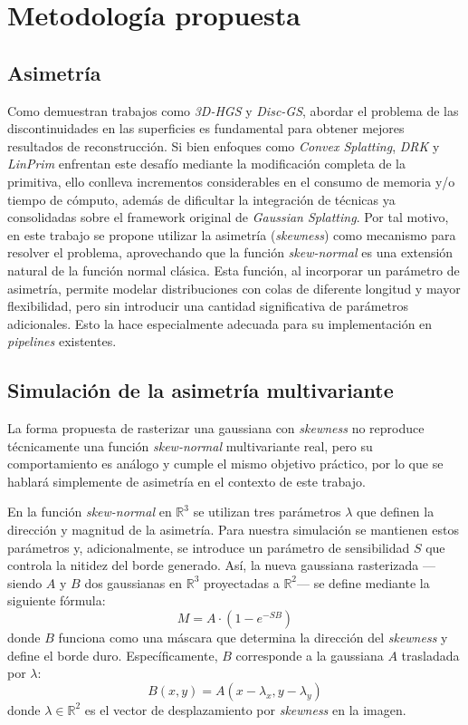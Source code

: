 \chapter{Metodología propuesta}\label{chapter:proposal}

\section{Asimetría}

Como demuestran trabajos como \textit{3D-HGS} y \textit{Disc-GS}, abordar el problema de las discontinuidades en las superficies es fundamental para obtener mejores resultados de reconstrucción. Si bien enfoques como \textit{Convex Splatting}, \textit{DRK} y \textit{LinPrim} enfrentan este desafío mediante la modificación completa de la primitiva, ello conlleva incrementos considerables en el consumo de memoria y/o tiempo de cómputo, además de dificultar la integración de técnicas ya consolidadas sobre el framework original de \textit{Gaussian Splatting}. Por tal motivo, en este trabajo se propone utilizar la asimetría (\textit{skewness}) como mecanismo para resolver el problema, aprovechando que la función \textit{skew-normal} es una extensión natural de la función normal clásica. Esta función, al incorporar un parámetro de asimetría, permite modelar distribuciones con colas de diferente longitud y mayor flexibilidad, pero sin introducir una cantidad significativa de parámetros adicionales. Esto la hace especialmente adecuada para su implementación en \textit{pipelines} existentes.

\section{Simulación de la asimetría multivariante}

La forma propuesta de rasterizar una gaussiana con \textit{skewness} no reproduce técnicamente una función \textit{skew-normal} multivariante real, pero su comportamiento es análogo y cumple el mismo objetivo práctico, por lo que se hablará simplemente de asimetría en el contexto de este trabajo.

En la función \textit{skew-normal} en $\mathbb{R}^{3}$ se utilizan tres parámetros $\lambda$ que definen la dirección y magnitud de la asimetría. Para nuestra simulación se mantienen estos parámetros y, adicionalmente, se introduce un parámetro de sensibilidad $S$ que controla la nitidez del borde generado. Así, la nueva gaussiana rasterizada —siendo $A$ y $B$ dos gaussianas en $\mathbb{R}^{3}$ proyectadas a $\mathbb{R}^2$— se define mediante la siguiente fórmula:
\begin{equation}
    M = A \cdot (1 - e^{-S B})
    \label{eq:skew_mask}
\end{equation}
donde $B$ funciona como una máscara que determina la dirección del \textit{skewness} y define el borde duro. Específicamente, $B$ corresponde a la gaussiana $A$ trasladada por $\lambda$:
\[
B(x, y) = A\left(x - \lambda_x, y - \lambda_y\right)
\]
donde $\lambda \in \mathbb{R}^{2}$ es el vector de desplazamiento por \textit{skewness} en la imagen.

